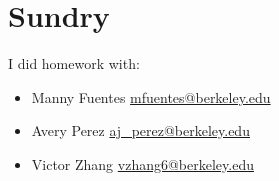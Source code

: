 \documentclass{article}
\begin{document}
\section{Sundry}

I did homework with:
\begin{itemize}
    \item Manny Fuentes \href{mailto:mfuentes@berkeley.edu}{mfuentes@berkeley.edu}
    \item Avery Perez \href{mailto:aj_perez@berkeley.edu}{aj\_perez@berkeley.edu}
    \item Victor Zhang \href{mailto:vzhang6@berkeley.edu}{vzhang6@berkeley.edu}
\end{itemize}
\end{document}
